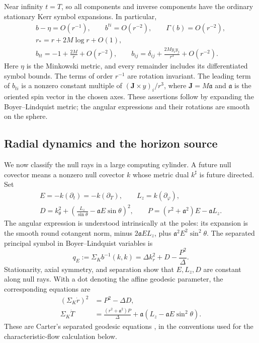 Near infinity $t=T$, so all components and inverse components have the
ordinary stationary Kerr symbol expansions.  In particular,
\begin{equation}
 \begin{gathered}
 b-\eta=O(r^{-1}),\qquad b^{ti}=O(r^{-2}),\qquad
 \Gamma(b)=O(r^{-2}),\\
 r_*=r+2M\log r+O(1),\\
 b_{tt}=-1+\frac{2M}{r}+O(r^{-2}),\qquad
 b_{ij}=\delta_{ij}+\frac{2M y_i y_j}{r^3}+O(r^{-2}).
 \end{gathered}
 \label{geo:end-expansions}
\end{equation}
Here $\eta$ is the Minkowski metric, and every remainder includes its
differentiated symbol bounds.  The terms of order $r^{-1}$ are rotation
invariant.  The leading term of $b_{ti}$ is a nonzero constant multiple of
$(\mathbf J\times y)_i/r^3$, where
$\mathbf J=M\boldsymbol{\mathfrak a}$ and
$\boldsymbol{\mathfrak a}$ is the oriented spin vector in the chosen
axes.  These assertions follow by expanding the Boyer--Lindquist metric;
the angular expressions and their rotations are smooth on the sphere.

\subsection{Radial dynamics and the horizon source}

We now classify the null rays in a large computing cylinder.  A future
null covector means a nonzero null covector $k$ whose metric dual
$k^\sharp$ is future directed.  Set
\begin{equation}
 \begin{gathered}
 E=-k(\partial_t)=-k(\partial_T),\qquad
 L_z=k(\partial_\varphi),\\
 D=k_\theta^2+
     \left(\frac{L_z}{\sin\theta}
                    -\mathfrak a E\sin\theta\right)^2,\qquad
 P=(r^2+\mathfrak a^2)E-\mathfrak a L_z.
 \end{gathered}
 \label{geo:constants}
\end{equation}
The angular expression is understood intrinsically at the poles: its
expansion is the smooth round cotangent norm, minus
$2\mathfrak a E L_z$, plus $\mathfrak a^2E^2\sin^2\theta$.
The separated principal symbol in Boyer--Lindquist variables is
\begin{equation}
 q_E:=\Sigma_K b^{-1}(k,k)
       =\Delta k_r^2+D-\frac{P^2}{\Delta}.
 \label{geo:separated-symbol}
\end{equation}
Stationarity, axial symmetry, and separation show that $E,L_z,D$ are
constant along null rays.  With a dot denoting the affine geodesic
parameter, the corresponding equations are
\begin{equation}
 \begin{aligned}
 (\Sigma_K\dot r)^2&=P^2-\Delta D,\\
 \Sigma_K\dot T&=
  \frac{(r^2+\mathfrak a^2)P}{\Delta}
       +\mathfrak a(L_z-\mathfrak a E\sin^2\theta).
 \end{aligned}
 \label{geo:ray-equations}
\end{equation}
These are Carter's separated geodesic equations
\cite{Carter1968}, in the conventions used for the characteristic-flow
calculation below.

